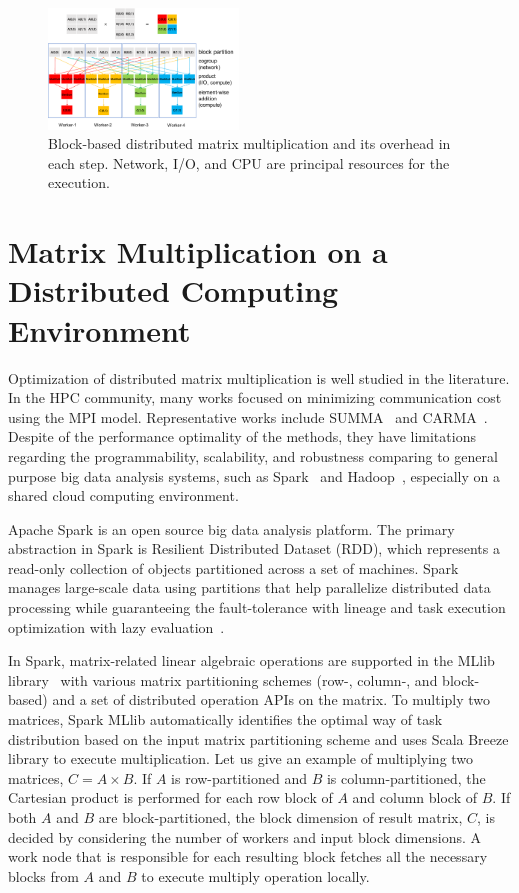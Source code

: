 \documentclass[10pt, conference, compsocconf]{IEEEtran}
\begin{document}
\begin{figure}[ht]
	\centering\includegraphics[width=0.45\textwidth]{figures/matmult-overhead-non-square-1.pdf}\caption{Block-based distributed matrix multiplication and its overhead in each step. Network, I/O, and CPU are principal resources for the execution.}\label{fig:matmul-with-overhead}
\end{figure}

\section{Matrix Multiplication on a Distributed Computing Environment}\label{sec:distributed-matrix-computation}
Optimization of distributed matrix multiplication is well studied in the literature. In the HPC community, many works focused on minimizing communication cost using the MPI model. Representative works include SUMMA~\cite{summa} and CARMA~\cite{carma}. Despite of the performance optimality of the methods, they have limitations regarding the programmability, scalability, and robustness comparing to general purpose big data analysis systems, such as Spark~\cite{spark} and Hadoop~\cite{hadoop}, especially on a shared cloud computing environment.

Apache Spark is an open source big data analysis platform. The primary abstraction in Spark is Resilient Distributed Dataset (RDD), which represents a read-only collection of objects partitioned across a set of machines. Spark manages large-scale data using partitions that help parallelize distributed data processing while guaranteeing the fault-tolerance with lineage and task execution optimization with lazy evaluation~\cite{spark}.

In Spark, matrix-related linear algebraic operations are supported in the MLlib library~\cite{spark-mm} with various matrix partitioning schemes (row-, column-, and block-based) and a set of distributed operation APIs on the matrix. To multiply two matrices, Spark MLlib automatically identifies the optimal way of task distribution based on the input matrix partitioning scheme and uses Scala Breeze library to execute multiplication. Let us give an example of multiplying two matrices, $C = A \times B$. If $A$ is row-partitioned and $B$ is column-partitioned, the Cartesian product is performed for each row block of $A$ and column block of $B$. If both $A$ and $B$ are block-partitioned, the block dimension of result matrix, $C$, is decided by considering the number of workers and input block dimensions. A work node that is responsible for each resulting block fetches all the necessary blocks from $A$ and $B$ to execute multiply operation locally.
\end{document}
